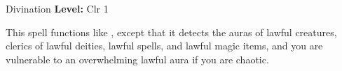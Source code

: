 {Divination}
{
	\textbf{Level:}
	Clr 1\\
}
{
	This spell functions like , except that it detects the auras of lawful creatures, clerics of lawful deities, lawful spells, and lawful magic items, and you are vulnerable to an overwhelming lawful aura if you are chaotic.

}
